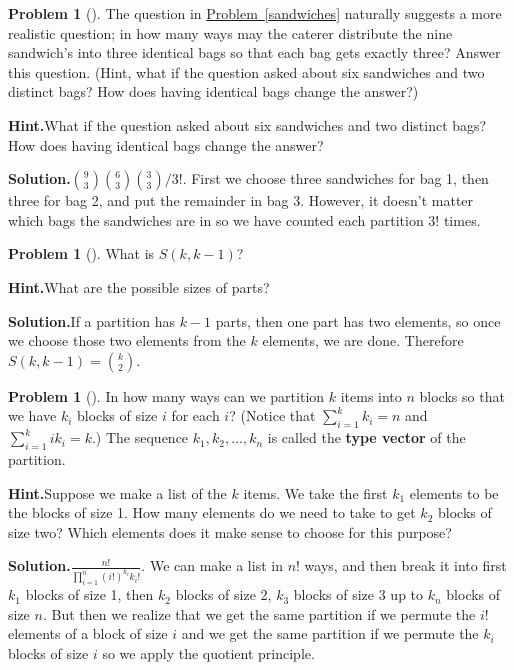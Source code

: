 \documentclass[10pt,]{book}
\newcommand{\terminology}[1]{\textbf{#1}}
\theoremstyle{plain}
\theoremstyle{definition}
\newtheorem{activity}[project]{Problem}
\theoremstyle{definition}
\numberwithin{equation}{chapter}
\begin{document}
\begin{activity}[]\label{caterer2}
The question in \hyperref[sandwiches]{Problem~\ref{sandwiches}} naturally suggests a more realistic question; in how many ways may the caterer distribute the nine sandwich's into three identical bags so that each bag gets exactly three? Answer this question. (Hint, what if the question asked about six sandwiches and two distinct bags? How does having identical bags change the answer?)%
\par\medskip\noindent%
\textbf{Hint.}\quad What if the question asked about six sandwiches and two distinct bags? How does having identical bags change the answer?%
\par\medskip\noindent%
\textbf{Solution.}\quad \(\binom{9}{3}\binom{6}{3}\binom{3}{3}/3!\). First we choose three sandwiches for bag 1, then three for bag 2, and put the remainder in bag 3. However, it doesn't matter which bags the sandwiches are in so we have counted each partition \(3!\) times.%
\end{activity}
\begin{activity}[]\label{activity-138}
What is \(S(k,k-1)\)?%
\par\medskip\noindent%
\textbf{Hint.}\quad What are the possible sizes of parts?%
\par\medskip\noindent%
\textbf{Solution.}\quad If a partition has \(k-1\) parts, then one part has two elements, so once we choose those two elements from the \(k\) elements, we are done.  Therefore \(S(k,k-1) = \binom{k}{2}\).%
\end{activity}
\begin{activity}[]\label{partitionsgivenpartsize}
In how many ways can we partition \(k\) items into \(n\) blocks so that we have \(k_i\) blocks of size \(i\) for each \(i\)? (Notice that \(\sum_{i=1}^k k_i = n\) and \(\sum_{i=1}^k ik_i = k\).) The sequence \(k_1,k_2,\ldots,k_n\) is called the \terminology{type vector} of the partition.%
\par\medskip\noindent%
\textbf{Hint.}\quad Suppose we make a list of the \(k\) items. We take the first \(k_1\) elements to be the blocks of size 1. How many elements do we need to take to get \(k_2\) blocks of size two? Which elements does it make sense to choose for this purpose?%
\par\medskip\noindent%
\textbf{Solution.}\quad \(\frac{n!}{\prod_{i=1}^n (i!)^{k_i}{k_i!}}\). We can make a list in \(n!\) ways, and then break it into first \(k_1\) blocks of size 1, then \(k_2\) blocks of size 2, \(k_3\) blocks of size 3 up to \(k_n\) blocks of size \(n\). But then we realize that we get the same partition if we permute the \(i!\) elements of a block of size \(i\) and we get the same partition if we permute the \(k_i\) blocks of size \(i\) so we apply the quotient principle.%
\end{activity}
\end{document}
